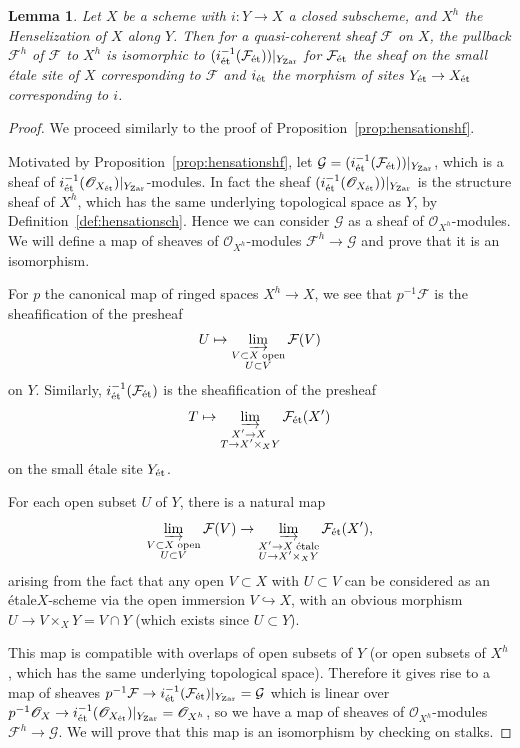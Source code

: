 \documentclass[12pt]{article}
\renewcommand{\O}{\mathscr{O}}
\newcommand{\F}{\mathcal{F}}
\newcommand{\G}{\mathcal{G}}
\newcommand{\colim}{\varinjlim}
\newcommand{\Et}{\'etale\xspace}
\newcommand{\et}{{\rm\acute{e}t}}
\newcommand{\zar}{{\rm Zar}}
\newtheorem{lemma}[theorem]{Lemma}
\theoremstyle{definition}
\numberwithin{equation}{subsection}
\begin{document}
\begin{lemma}\label{lem:fancypullback} Let $X$ be a scheme with $i: Y \to X$ a closed subscheme, and $X^h$ the Henselization of $X$ along $Y$. Then for a quasi-coherent sheaf $\F$ on $X$, the pullback $\F^h$ of $\F$ to $X^h$ is isomorphic to $(i_{\et}^{-1}(\F_{\et}))|_{Y_{\zar}}$ for $\F_{\et}$ the sheaf on the small \Et site of $X$ corresponding to $\F$ and $i_{\et}$ the morphism of sites $Y_{\et} \to X_{\et}$ corresponding to $i$. 
\end{lemma}
\begin{proof}
We proceed similarly to the proof of Proposition~\ref{prop:hensationshf}. 

Motivated by Proposition~\ref{prop:hensationshf}, let $\G=(i_{\et}^{-1}(\F_{\et}))|_{Y_{\zar}}$, which is a sheaf of $i_{\et}^{-1}(\O_{X_{\et}})|_{Y_{\zar}}$-modules. In fact the sheaf $(i_{\et}^{-1}(\O_{X_{\et}}))|_{Y_{\zar}}$ is the structure sheaf of $X^h$, which has the same underlying topological space as $Y$, by Definition~\ref{def:hensationsch}. Hence we can consider $\G$ as a sheaf of $\O_{X^h}$-modules. We will define a map of sheaves of $\O_{X^h}$-modules $\F^h \to \G$ and prove that it is an isomorphism.




For $p$ the canonical map of ringed spaces $X^h \to X$, we see that $p^{-1}\F$ is the sheafification of the presheaf $$U \mapsto \colim_{\substack{V \subset X \;\text{open}\\U \subset V}} \F(V)$$ on $Y$. Similarly, $i_{\et}^{-1}(\F_{\et})$ is the sheafification of the presheaf $$T \mapsto \colim_{\substack{X' \to X\;\\T \to X' \times_X Y}} \F_{\et}(X')$$ on the small \Et site $Y_{\et}$.

For each open subset $U$ of $Y$, there is a natural map $$\colim_{\substack{V \subset X \;\text{open}\\U \subset V}} \F(V) \to \colim_{\substack{X' \to X\;\text{\Et}\\U \to X' \times_X Y}} \F_{\et}(X'),$$ arising from the fact that any open $V \subset X$ with $U \subset V$ can be considered as an \Et $X$-scheme via the open immersion $V \hookrightarrow X$, with an obvious morphism $U \to V \times_X Y = V \cap Y$ (which exists since $U \subset Y$).

This map is compatible with overlaps of open subsets of $Y$ (or open subsets of $X^h$, which has the same underlying topological space). Therefore it gives rise to a map of sheaves $p^{-1}\F \to i_{\et}^{-1}(\F_{\et})|_{Y_{\zar}}=\G$ which is linear over $p^{-1}\O_X \to i_{\et}^{-1}(\O_{X_{\et}})|_{Y_{\zar}}=\O_{X^h}$, so we have a map of sheaves of $\O_{X^h}$-modules $\F^h \to \G$. We will prove that this map is an isomorphism by checking on stalks. 



\end{proof}
\end{document}
